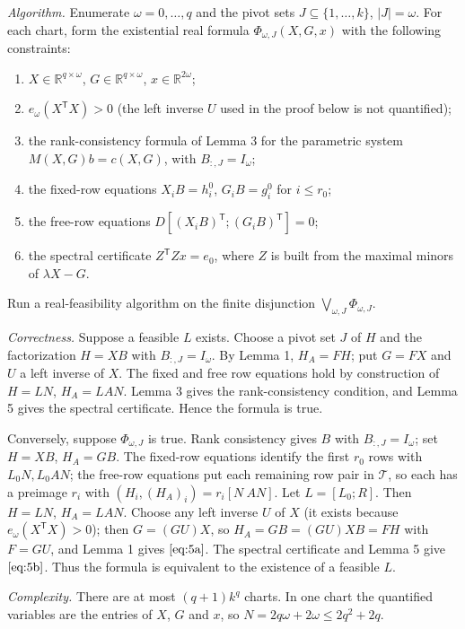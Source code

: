 \documentclass[journal]{IEEEtran}
\theoremstyle{plainn}
\theoremstyle{remark}
\begin{document}
\emph{Algorithm.} Enumerate $\omega=0,\ldots,q$ and the pivot sets $J\subseteq\{1,\dots,k\}$, $|J|=\omega$. For each chart, form the existential real formula $\Phi_{\omega,J}(X,G,x)$ with the following constraints:

\begin{enumerate}
\item $X\in\mathbb R^{q\times\omega}$, $G\in\mathbb R^{q\times\omega}$, $x\in\mathbb R^{2\omega}$;
\item $e_\omega(X^{\mathsf T}X)>0$ (the left inverse $U$ used in the proof below is not quantified);
\item the rank-consistency formula of Lemma 3 for the parametric system $M(X,G)b=c(X,G)$, with $B_{:,J}=I_\omega$;
\item the fixed-row equations $X_iB=h_i^0$, $G_iB=g_i^0$ for $i\le r_0$;
\item the free-row equations $D[(X_iB)^{\mathsf T};(G_iB)^{\mathsf T}]=0$;
\item the spectral certificate $Z^{\mathsf T}Zx=e_0$, where $Z$ is built from the maximal minors of $\lambda X-G$.
\end{enumerate}
Run a real-feasibility algorithm on the finite disjunction $\bigvee_{\omega,J}\Phi_{\omega,J}$.

\emph{Correctness.} Suppose a feasible $L$ exists. Choose a pivot set $J$ of $H$ and the factorization $H=XB$ with $B_{:,J}=I_\omega$. By Lemma 1, $H_A=FH$; put $G=FX$ and $U$ a left inverse of $X$. The fixed and free row equations hold by construction of $H=LN$, $H_A=LAN$. Lemma 3 gives the rank-consistency condition, and Lemma 5 gives the spectral certificate. Hence the formula is true.

Conversely, suppose $\Phi_{\omega,J}$ is true. Rank consistency gives $B$ with $B_{:,J}=I_\omega$; set $H=XB$, $H_A=GB$. The fixed-row equations identify the first $r_0$ rows with $L_0N,L_0AN$; the free-row equations put each remaining row pair in $\mathcal T$, so each has a preimage $r_i$ with $(H_i,(H_A)_i)=r_i[N\ AN]$. Let $L=[L_0;R]$. Then $H=LN$, $H_A=LAN$. Choose any left inverse $U$ of $X$ (it exists because $e_\omega(X^{\mathsf T}X)>0$); then $G=(GU)X$, so $H_A=GB=(GU)XB=FH$ with $F=GU$, and Lemma 1 gives $\eqref{eq:5a}$. The spectral certificate and Lemma 5 give $\eqref{eq:5b}$. Thus the formula is equivalent to the existence of a feasible $L$.

\emph{Complexity.} There are at most $(q+1)k^q$ charts. In one chart the quantified variables are the entries of $X$, $G$ and $x$, so $N=2q\omega+2\omega\le2q^2+2q$.
\end{document}
